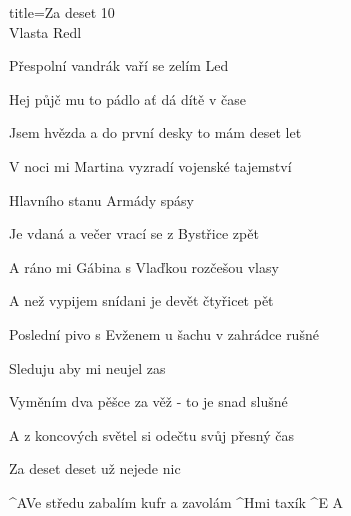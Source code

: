 \begin{song}{title=\predtitle\centering Za deset 10 \\\large Vlasta Redl  \vspace*{-0.3cm}}
\begin{centerjustified}
\begin{varwidth}[t]{0.50\textwidth}
	Přespolní vandrák vaří se zelím Led
	
	Hej půjč mu to pádlo ať dá dítě v čase
	
	Jsem hvězda a do první desky to mám deset let


\end{varwidth}\mezisloupci\begin{varwidth}[t]{0.55\textwidth}\setlength{\parindent}{0.05cm}
\vspace*{0.0525cm}  %

\sloka
	V noci mi Martina vyzradí vojenské tajemství
	
	Hlavního stanu Armády spásy
	
	Je vdaná a večer vrací se z Bystřice zpět
	
	A ráno mi Gábina s Vlaďkou rozčešou vlasy
	
	A než vypijem snídani je devět čtyřicet pět
	

\sloka
	Poslední pivo s Evženem u šachu v zahrádce rušné
	
	Sleduju aby mi neujel zas

	Vyměním dva pěšce za věž - to je snad slušné

	A z koncových světel si odečtu svůj přesný čas

	Za deset deset už nejede nic

	^{A}Ve středu zabalím kufr a zavolám ^{Hmi \z}taxík ^{E A}

\end{varwidth}
\end{centerjustified}
\setcounter{Slokočet}{0}
\end{song}
